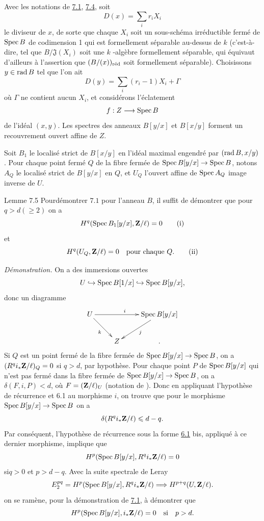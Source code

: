 \documentclass[10pt]{../fichiers-configuration-latex/smfart}
\begin{document}
Avec les notations de \hyperref[XIX.lem7.1]{7.1}, \hyperref[XIX.cor7.4]{7.4}, soit
$$
D(x)=\sum_{i}r_{i}X_{i}
$$
le diviseur de $x$, de sorte que chaque $X_{i}$ soit un sous-schéma
irréductible fermé de $\operatorname{Spec} B$ de codimension 1 qui est formellement
séparable au-dessus de $k$ (c'est-à-dire, tel que
$B/\mathfrak{J}(X_{i})$ soit une $k$ -algèbre formellement séparable,
qui équivaut d'ailleurs à l'assertion que $(B/(x))_{\text{\rm
réd}}$ soit formellement séparable). Choisissons $y\in\operatorname{rad} B$ tel que
l'on ait
$$
D(y)=\sum_{i}(r_{i}-1)X_{i}+\Gamma
$$
où $\Gamma$ ne contient aucun $X_{i}$, et considérons l'éclatement
$$
f:Z\longrightarrow \operatorname{Spec} B
$$
de l'idéal $(x,y)$. Les spectres des anneaux $B[y/x]$ et $B[x/y]$
forment un recouvrement ouvert affine de $Z$.

Soit $B_{1}$ le localisé strict de $B[x/y]$ en l'idéal maximal
engendré par $(\operatorname{rad} B,x/y)$. Pour chaque point fermé $Q$ de la fibre
fermée de $\operatorname{Spec} B[y/x]\rightarrow \operatorname{Spec} B$, notons $A_{Q}$ le
localisé strict de $B[y/x]$ en $Q$, et $U_{Q}$ l'ouvert affine de
$\operatorname{Spec} A_{Q}$ image inverse de $U$.

\begin{enonce*}{Lemme 7.5}
Pour\pageoriginale démontrer $7.1$ pour l'anneau $B$, il suffit de
démontrer que pour $q>d(\geq 2)$ on a
\begin{equation*}
H^{q}(\operatorname{Spec} B_{1}[y/x],\mathbf{Z}/\ell)=0\tag{i}
\end{equation*}
et
\begin{equation*}
H^{q}(U_{Q},\mathbf{Z}/\ell)=0\quad\text{pour chaque $Q$}{}.\tag{ii}
\end{equation*}
\end{enonce*}

\medskip
\noindent
\emph{Démonstration.} On a des immersions ouvertes
$$
U\hookrightarrow \operatorname{Spec} B[1/x]\hookrightarrow \operatorname{Spec} B[y/x]{},
$$
donc un diagramme
$$
\xymatrix{
U \ar[rr]^{i} \ar[rd]_{k}&         & \Spec B[y/x] \ar[ld]^j\\
                        &   Z     &      . 
}
$$
Si $Q$ est un point fermé de la fibre fermée de $\operatorname{Spec}
B[y/x]\rightarrow \operatorname{Spec} B$, on a
$(R^{q}i_{\ast}\mathbf{Z}/\ell)_{Q}=0$ si $q>d$, par hypothèse. Pour
chaque point $P$ de $\operatorname{Spec} B[y/x]$ qui n'est pas fermé dans la fibre
fermée de $\operatorname{Spec} B[y/x]\rightarrow \operatorname{Spec} B$, on a $\delta(F,i,P)<d$,
où $F=(\mathbf{Z}/\ell)_{U}$ (notation de ). Donc en appliquant
l'hypothèse de récurrence et 6.1 au morphisme $i$, on trouve que pour
le morphisme $\operatorname{Spec} B[y/x]\rightarrow \operatorname{Spec} B$ on a
$$
\delta(R^{q}i_{\ast}\mathbf{Z}/\ell)\leqslant d-q{}.
$$
Par conséquent, l'hypothèse de récurrence sous la forme \hyperref[XIX.thm6.1]{6.1} bis,
appliqué à ce dernier morphisme, implique que 
$$
H^{p}(\operatorname{Spec} B[y/x],R^{q}i_{\ast}\mathbf{Z}/\ell)=0
$$
si\pageoriginale $q>0$ et $p>d-q$. Avec la suite spectrale de Leray
$$
E^{pq}_{2}=H^{p}(\operatorname{Spec}
B[y/x],R^{q}i_{\ast}\mathbf{Z}/\ell)\Longrightarrow
H^{p+q}(U,\mathbf{Z} / \ell){}.
$$
on se ramène, pour la démonstration de \hyperref[XIX.lem7.1]{7.1}, à démontrer que
$$
H^{p}(\operatorname{Spec} B[y/x],i_{\ast}\mathbf{Z}/\ell)=0\quad\text{\rm si}\quad
p>d{}.
$$
\end{document}
